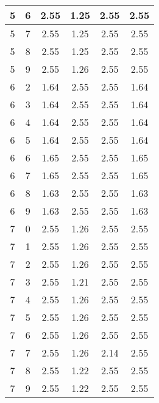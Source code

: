 \begin{longtable}{|c|c||c||c|c||c|}
	5 & 6 & 2.55 & 1.25 & 2.55 & 2.55 \\ \hline
	5 & 7 & 2.55 & 1.25 & 2.55 & 2.55 \\ \hline
	5 & 8 & 2.55 & 1.25 & 2.55 & 2.55 \\ \hline
	5 & 9 & 2.55 & 1.26 & 2.55 & 2.55 \\ \hline
	6 & 2 & 1.64 & 2.55 & 2.55 & 1.64 \\ \hline
	6 & 3 & 1.64 & 2.55 & 2.55 & 1.64 \\ \hline
	6 & 4 & 1.64 & 2.55 & 2.55 & 1.64 \\ \hline
	6 & 5 & 1.64 & 2.55 & 2.55 & 1.64 \\ \hline
	6 & 6 & 1.65 & 2.55 & 2.55 & 1.65 \\ \hline
	6 & 7 & 1.65 & 2.55 & 2.55 & 1.65 \\ \hline
	6 & 8 & 1.63 & 2.55 & 2.55 & 1.63 \\ \hline
	6 & 9 & 1.63 & 2.55 & 2.55 & 1.63 \\ \hline
	7 & 0 & 2.55 & 1.26 & 2.55 & 2.55 \\ \hline
	7 & 1 & 2.55 & 1.26 & 2.55 & 2.55 \\ \hline
	7 & 2 & 2.55 & 1.26 & 2.55 & 2.55 \\ \hline
	7 & 3 & 2.55 & 1.21 & 2.55 & 2.55 \\ \hline
	7 & 4 & 2.55 & 1.26 & 2.55 & 2.55 \\ \hline
	7 & 5 & 2.55 & 1.26 & 2.55 & 2.55 \\ \hline
	7 & 6 & 2.55 & 1.26 & 2.55 & 2.55 \\ \hline
	7 & 7 & 2.55 & 1.26 & 2.14 & 2.55 \\ \hline
	7 & 8 & 2.55 & 1.22 & 2.55 & 2.55 \\ \hline
	7 & 9 & 2.55 & 1.22 & 2.55 & 2.55 \\ \hline
\end{longtable}

